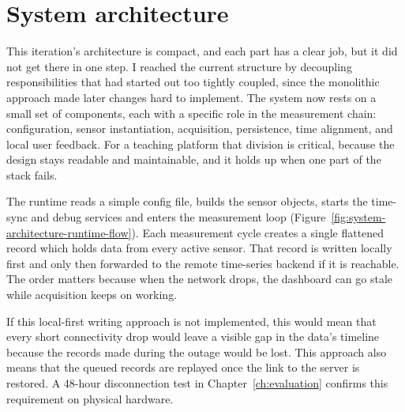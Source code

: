 ﻿\chapter{System architecture}
\label{ch:architecture}

This iteration's architecture is compact, and each part has a clear job, but it did not get there in one step. I reached the current structure by decoupling responsibilities that had started out too tightly coupled, since the monolithic approach made later changes hard to implement. The system now rests on a small set of components, each with a specific role in the measurement chain: configuration, sensor instantiation, acquisition, persistence, time alignment, and local user feedback. For a teaching platform that division is critical, because the design stays readable and maintainable, and it holds up when one part of the stack fails.

The runtime reads a simple config file, builds the sensor objects, starts the time-sync and debug services and enters the measurement loop (Figure~\ref{fig:system-architecture-runtime-flow}). Each measurement cycle creates a single flattened record which holds data from every active sensor. That record is written locally first and only then forwarded to the remote time-series backend if it is reachable. The order matters because when the network drops, the dashboard can go stale while acquisition keeps on working.

If this local-first writing approach is not implemented, this would mean that every short connectivity drop would leave a visible gap in the data's timeline because the records made during the outage would be lost. This approach also means that the queued records are replayed once the link to the server is restored. A 48-hour disconnection test in Chapter~\ref{ch:evaluation} confirms this requirement on physical hardware.

